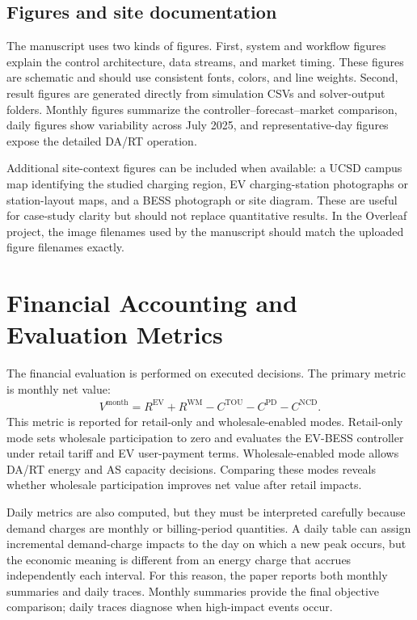 \documentclass[final,5p,times]{elsarticle}
\newcommand{\EV}{\mathrm{EV}}
\newcommand{\TOU}{\mathrm{TOU}}
\newcommand{\PD}{\mathrm{PD}}
\newcommand{\NCD}{\mathrm{NCD}}
\newcommand{\WM}{\mathrm{WM}}
\begin{document}
\subsection{Figures and site documentation}
The manuscript uses two kinds of figures. First, system and workflow figures explain the control architecture, data streams, and market timing. These figures are schematic and should use consistent fonts, colors, and line weights. Second, result figures are generated directly from simulation CSVs and solver-output folders. Monthly figures summarize the controller--forecast--market comparison, daily figures show variability across July 2025, and representative-day figures expose the detailed DA/RT operation.

Additional site-context figures can be included when available: a UCSD campus map identifying the studied charging region, EV charging-station photographs or station-layout maps, and a BESS photograph or site diagram. These are useful for case-study clarity but should not replace quantitative results. In the Overleaf project, the image filenames used by the manuscript should match the uploaded figure filenames exactly.
\section{Financial Accounting and Evaluation Metrics}
\label{sec:metrics}

The financial evaluation is performed on executed decisions. The primary metric is monthly net value:
\begin{align}
V^{\mathrm{month}}=R^{\EV}+R^{\WM}-C^{\TOU}-C^{\PD}-C^{\NCD}.
\label{eq:month_value_metric}
\end{align}
This metric is reported for retail-only and wholesale-enabled modes. Retail-only mode sets wholesale participation to zero and evaluates the EV-BESS controller under retail tariff and EV user-payment terms. Wholesale-enabled mode allows DA/RT energy and AS capacity decisions. Comparing these modes reveals whether wholesale participation improves net value after retail impacts.

Daily metrics are also computed, but they must be interpreted carefully because demand charges are monthly or billing-period quantities. A daily table can assign incremental demand-charge impacts to the day on which a new peak occurs, but the economic meaning is different from an energy charge that accrues independently each interval. For this reason, the paper reports both monthly summaries and daily traces. Monthly summaries provide the final objective comparison; daily traces diagnose when high-impact events occur.
\end{document}
